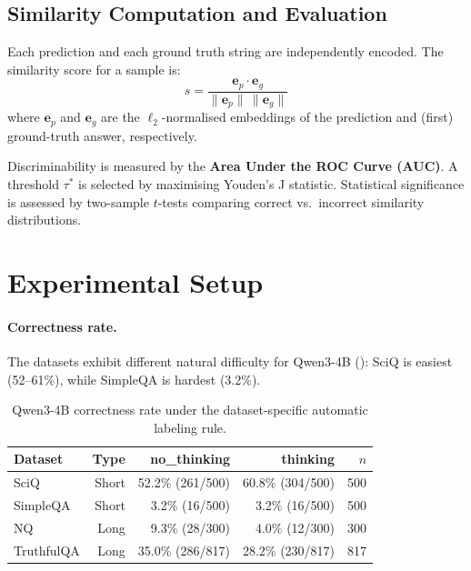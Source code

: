 \documentclass{article}
\begin{document}
\subsection{Similarity Computation and Evaluation}

Each prediction and each ground truth string are independently encoded.
The similarity score for a sample is:
\begin{equation}
  s = \frac{\mathbf{e}_p \cdot \mathbf{e}_g}{\|\mathbf{e}_p\|\,\|\mathbf{e}_g\|}
\end{equation}
where $\mathbf{e}_p$ and $\mathbf{e}_g$ are the $\ell_2$-normalised embeddings of
the prediction and (first) ground-truth answer, respectively.

Discriminability is measured by the \textbf{Area Under the ROC Curve (AUC)}.
A threshold $\tau^*$ is selected by maximising Youden's J statistic.
Statistical significance is assessed by two-sample $t$-tests comparing correct vs.\
incorrect similarity distributions.

\section{Experimental Setup}
\label{sec:setup}

\paragraph{Correctness rate.}
The datasets exhibit different natural difficulty for Qwen3-4B
(): SciQ is easiest (52--61\%), while SimpleQA is hardest (3.2\%).

\begin{table}[t]
\centering
\caption{Qwen3-4B correctness rate under the dataset-specific automatic labeling rule.}
\label{tab:accuracy}
\begin{tabular}{lrrrr}
\toprule
\textbf{Dataset} & \textbf{Type} & \textbf{no\_thinking} & \textbf{thinking} & $n$ \\
\midrule
SciQ       & Short & 52.2\% (261/500)  & 60.8\% (304/500) & 500 \\
SimpleQA   & Short &  3.2\% (16/500)   &  3.2\% (16/500)  & 500 \\
NQ         & Long  &  9.3\% (28/300)   &  4.0\% (12/300)  & 300 \\
TruthfulQA & Long  & 35.0\% (286/817)  & 28.2\% (230/817) & 817 \\
\bottomrule
\end{tabular}
\end{table}
\end{document}
